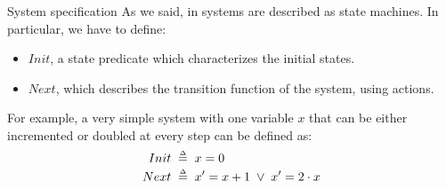 \begin{frame}{System specification}
    As we said, in \tlap systems are described as state machines. In particular, we have to define:
    \begin{itemize}
        \item $Init$, a state predicate which characterizes the initial states.
        \item $Next$, which describes the transition function of the system, using actions.
    \end{itemize}
    \pause
    For example, a very simple system with one variable $x$ that can be either incremented or doubled at every step can be defined as:
    \begin{align*}
        Init &\;\mathrel{\smash {{\stackrel{\scriptscriptstyle\Delta}{=}}}}\; x = 0 \\
        Next &\;\mathrel{\smash {{\stackrel{\scriptscriptstyle\Delta}{=}}}}\; x' = x+1 \; \lor \; x' = 2 \cdot x\\
    \end{align*}
\end{frame}
